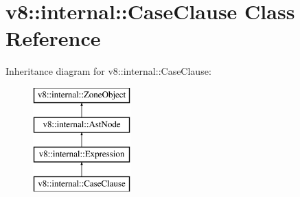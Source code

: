 \hypertarget{classv8_1_1internal_1_1_case_clause}{}\section{v8\+:\+:internal\+:\+:Case\+Clause Class Reference}
\label{classv8_1_1internal_1_1_case_clause}
Inheritance diagram for v8\+:\+:internal\+:\+:Case\+Clause\+:\begin{figure}[H]
\begin{center}
\leavevmode
\includegraphics[height=4.000000cm]{classv8_1_1internal_1_1_case_clause}
\end{center}
\end{figure}
